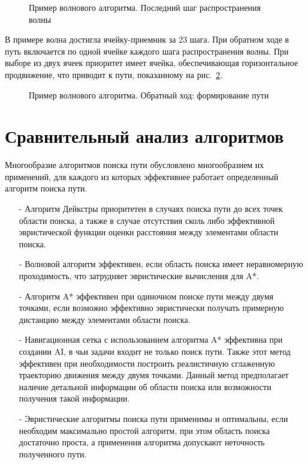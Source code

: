 \begin{figure}[h!t]
\caption{Пример волнового алгоритма. Последний шаг распространения волны}
\label{ris:wave-5}
\end{figure}

В примере волна достигла ячейку-приемник за 23 шага.
При обратном ходе в путь включается по одной ячейке каждого шага распространения волны. 
При выборе из двух ячеек приоритет имеет ячейка, обеспечивающая горизонтальное продвижение, что приводит к пути, показанному на рис.~\ref{ris:wave-6}.

\begin{figure}[h!t]
\caption{Пример волнового алгоритма. Обратный ход: формирование пути}
\label{ris:wave-6}
\end{figure}

\section{Сравнительный анализ алгоритмов}
Многообразие алгоритмов поиска пути обусловлено многообразием их применений, для каждого из которых эффективнее работает определенный алгоритм поиска пути.
\begin{itemize}
\item [-] Алгоритм Дейкстры приоритетен в случаях поиска пути до всех точек области поиска, а также в случае отсутствия сколь либо эффективной эвристической функции оценки расстояния между элементами области поиска.
\item [-] Волновой алгоритм эффективен, если область поиска имеет неравномерную проходимость, что затрудняет эвристические вычисления для A*.
\item [-] Алгоритм A* эффективен при одиночном поиске пути между двумя точками, если возможно эффективно эвристически получать примерную дистанцию между элементами области поиска.
\item [-] Навигационная сетка с использованием алгоритма A* эффективна при создании AI, в чьи задачи входит не только поиск пути. Также этот метод эффективен при необходимости построить реалистичную сглаженную траекторию движения между двумя точками. Данный метод предполагает наличие детальной информации об области поиска или возможности получения такой информации.
\item [-] Эвристические алгоритмы поиска пути применимы и оптимальны, если необходим максимально простой алгоритм, при этом область поиска достаточно проста, а применения алгоритма допускают неточность полученного пути.  
\end{itemize}


